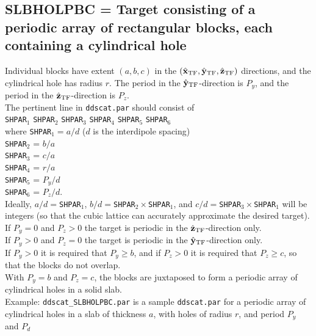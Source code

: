 \subsection{ SLBHOLPBC = Target consisting of a periodic array of
             rectangular blocks, each containing a cylindrical hole
             \label{sec:SLBHOLPBC}}
        \label{sec:SLBHOLPBC}
        Individual blocks have extent $(a,b,c)$ in the $(\hat{\bf x}_{\rm TF},\hat{\bf y}_{\rm TF},\hat{\bf z}_{\rm TF})$
        directions,
        and the cylindrical hole has radius $r$.
        The period in the $\hat{\bf y}_{\rm TF}$-direction is $P_y$, and
        the period in the $\hat{\bf z}_{\rm TF}$-direction is $P_z$.\\
        The pertinent line in {\tt ddscat.par} should consist of\\
        {\tt SHPAR}$_1$ {\tt SHPAR}$_2$ {\tt SHPAR}$_3$ {\tt SHPAR}$_4$
        {\tt SHPAR}$_5$ {\tt SHPAR}$_6$\\
        where {\tt SHPAR}$_1 = a/d$ ($d$ is the interdipole spacing)\\
        {\tt SHPAR$_2$} = $b/a$ \\
        {\tt SHPAR$_3$} = $c/a$ \\
        {\tt SHPAR$_4$} = $r/a$ \\
        {\tt SHPAR$_5$} = $P_y/d$ \\
        {\tt SHPAR$_6$} = $P_z/d$.\\
        Ideally, $a/d=${\tt SHPAR}$_1$,
        $b/d=${\tt SHPAR}$_2\times${\tt SHPAR}$_1$, and
        $c/d=${\tt SHPAR}$_3\times${\tt SHPAR}$_1$ will be integers (so that the
        cubic lattice can accurately approximate the desired target).
        If $P_y=0$ and $P_z>0$ the target is periodic in the
        $\hat{\bf z}_{\rm TF}$-direction only.\\
        If $P_y>0$ and $P_z=0$ the target is periodic in the 
        $\hat{\bf y}_{\rm TF}$-direction only.\\
        If $P_y>0$ it is required that $P_y\geq b$, 
        and if $P_z>0$ it is required that $P_z\geq c$, so that
        the blocks do not overlap.\\
        With $P_y=b$ and $P_z=c$, the blocks are juxtaposed 
        to form a periodic array of cylindrical holes in a solid slab.\\
        Example: {\tt ddscat\_SLBHOLPBC.par} is a sample {\tt ddscat.par}
        for a periodic array of cylindrical holes in a slab of thickness
        $a$, with holes of radius $r$, and period $P_y$ and $P_d$
